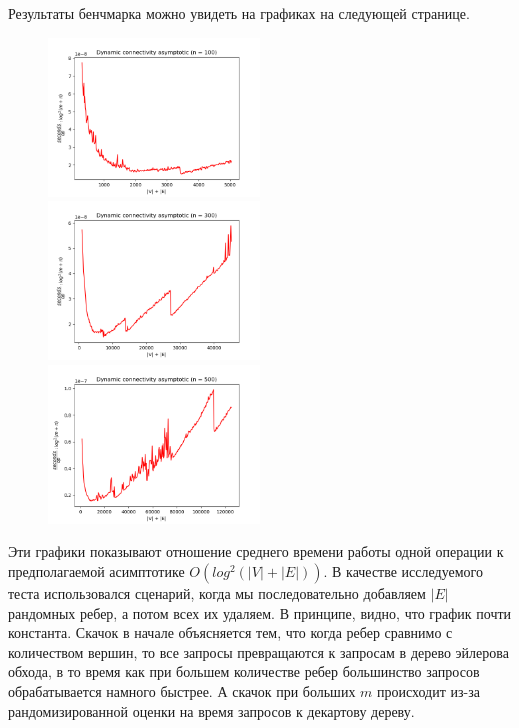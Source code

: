 \documentclass[a4paper]{article}
\begin{document}
Результаты бенчмарка можно увидеть на графиках на следующей странице.
\begin{figure}[h]
  \centering
  \includegraphics[width=0.5\textwidth]{graphics100.png}
  \includegraphics[width=0.5\textwidth]{graphics300.png}
  \includegraphics[width=0.5\textwidth]{graphics500.png}
\end{figure}

Эти графики показывают отношение среднего времени работы одной операции к
предполагаемой асимптотике $O(log^2(|V| + |E|))$. В качестве исследуемого теста
использовался сценарий, когда мы последовательно добавляем $|E|$ рандомных
ребер, а потом всех их удаляем. В принципе, видно, что график почти константа.
Скачок в начале объясняется тем, что когда ребер сравнимо с количеством вершин,
то все запросы превращаются к запросам в дерево эйлерова обхода, в то время как
при большем количестве ребер большинство запросов обрабатывается
намного быстрее. А скачок при больших $m$ происходит из-за рандомизированной
оценки на время запросов к декартову дереву. 
\end{document}

